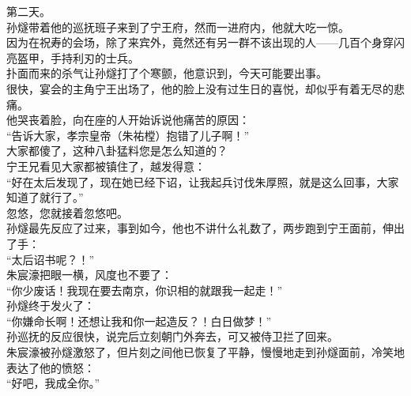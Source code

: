 \begin{multicols}{\theparacolNo}
第二天。\\

孙燧带着他的巡抚班子来到了宁王府，然而一进府内，他就大吃一惊。\\

因为在祝寿的会场，除了来宾外，竟然还有另一群不该出现的人——几百个身穿闪亮盔甲，手持利刃的士兵。\\

扑面而来的杀气让孙燧打了个寒颤，他意识到，今天可能要出事。\\

很快，宴会的主角宁王出场了，他的脸上没有过生日的喜悦，却似乎有着无尽的悲痛。\\

他哭丧着脸，向在座的人开始诉说他痛苦的原因：\\

“告诉大家，孝宗皇帝（朱祐樘）抱错了儿子啊！”\\

大家都傻了，这种八卦猛料您是怎么知道的？\\

宁王兄看见大家都被镇住了，越发得意：\\

“好在太后发现了，现在她已经下诏，让我起兵讨伐朱厚照，就是这么回事，大家知道了就行了。”\\

忽悠，您就接着忽悠吧。\\

孙燧最先反应了过来，事到如今，他也不讲什么礼数了，两步跑到宁王面前，伸出了手：\\

“太后诏书呢？！”\\

朱宸濠把眼一横，风度也不要了：\\

“你少废话！我现在要去南京，你识相的就跟我一起走！”\\

孙燧终于发火了：\\

“你嫌命长啊！还想让我和你一起造反？！白日做梦！”\\

孙巡抚的反应很快，说完后立刻朝门外奔去，可又被侍卫拦了回来。\\

朱宸濠被孙燧激怒了，但片刻之间他已恢复了平静，慢慢地走到孙燧面前，冷笑地表达了他的愤怒：\\

“好吧，我成全你。”\\


\end{multicols}

